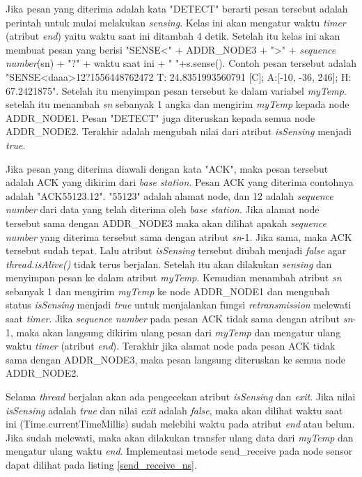 Jika pesan yang diterima adalah kata "DETECT" berarti pesan tersebut adalah perintah untuk mulai melakukan \textit{sensing}. Kelas ini akan mengatur waktu \textit{timer} (atribut \textit{end}) yaitu waktu saat ini ditambah 4 detik. Setelah itu kelas ini akan membuat pesan yang berisi "SENSE<" + ADDR\_NODE3 + ">" + \textit{sequence number}(sn) + "?" + waktu saat ini + " "+s.sense(). Contoh pesan tersebut adalah "SENSE<daaa>12?1556448762472 T: 24.8351993560791 [C]; A:[-10, -36, 246]; H: 67.2421875". Setelah itu menyimpan pesan tersebut ke dalam variabel \textit{myTemp}. setelah itu menambah \textit{sn} sebanyak 1 angka dan mengirim \textit{myTemp} kepada node ADDR\_NODE1. Pesan "DETECT" juga diteruskan kepada semua node ADDR\_NODE2. Terakhir adalah mengubah nilai dari atribut \textit{isSensing} menjadi \textit{true}.

Jika pesan yang diterima diawali dengan kata "ACK", maka pesan tersebut adalah ACK yang dikirim dari \textit{base station}. Pesan ACK yang diterima contohnya adalah "ACK55123.12". "55123" adalah alamat node, dan 12 adalah \textit{sequence number} dari data yang telah diterima oleh \textit{base station}. Jika alamat node tersebut sama dengan ADDR\_NODE3 maka akan dilihat apakah \textit{sequence number} yang diterima tersebut sama dengan atribut \textit{sn}-1. Jika sama, maka ACK tersebut sudah tepat. Lalu atribut \textit{isSensing} tersebut diubah menjadi \textit{false} agar \textit{thread.isAlive()} tidak terus berjalan. Setelah itu akan dilakukan \textit{sensing} dan menyimpan pesan ke dalam atribut \textit{myTemp}. Kemudian menambah atribut \textit{sn} sebanyak 1 dan mengirim \textit{myTemp} ke node ADDR\_NODE1 dan mengubah status \textit{isSensing} menjadi \textit{true} untuk menjalankan fungsi \textit{retransmission} melewati saat \textit{timer}. Jika \textit{sequence number} pada pesan ACK tidak sama dengan atribut \textit{sn}-1, maka akan langsung dikirim ulang pesan dari \textit{myTemp} dan mengatur ulang waktu \textit{timer} (atribut \textit{end}). Terakhir jika alamat node pada pesan ACK tidak sama dengan ADDR\_NODE3, maka pesan langsung diteruskan ke semua node ADDR\_NODE2.

Selama \textit{thread} berjalan akan ada pengecekan atribut \textit{isSensing} dan \textit{exit}. Jika nilai \textit{isSensing} adalah \textit{true} dan nilai \textit{exit} adalah \textit{false}, maka akan dilihat waktu saat ini (Time.currentTimeMillis) sudah melebihi waktu pada atribut \textit{end} atau belum. Jika sudah melewati, maka akan dilakukan transfer ulang data dari \textit{myTemp} dan mengatur ulang waktu \textit{end}.
Implementasi metode send\_receive pada node sensor dapat dilihat pada listing \ref{send_receive_ns}.

